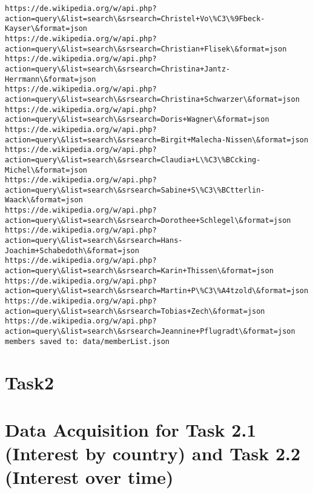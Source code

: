 \documentclass[11pt]{article}
\begin{document}
\begin{Verbatim}[commandchars=\\\{\}]
https://de.wikipedia.org/w/api.php?action=query\&list=search\&srsearch=Christel+Vo\%C3\%9Fbeck-Kayser\&format=json
https://de.wikipedia.org/w/api.php?action=query\&list=search\&srsearch=Christian+Flisek\&format=json
https://de.wikipedia.org/w/api.php?action=query\&list=search\&srsearch=Christina+Jantz-Herrmann\&format=json
https://de.wikipedia.org/w/api.php?action=query\&list=search\&srsearch=Christina+Schwarzer\&format=json
https://de.wikipedia.org/w/api.php?action=query\&list=search\&srsearch=Doris+Wagner\&format=json
https://de.wikipedia.org/w/api.php?action=query\&list=search\&srsearch=Birgit+Malecha-Nissen\&format=json
https://de.wikipedia.org/w/api.php?action=query\&list=search\&srsearch=Claudia+L\%C3\%BCcking-Michel\&format=json
https://de.wikipedia.org/w/api.php?action=query\&list=search\&srsearch=Sabine+S\%C3\%BCtterlin-Waack\&format=json
https://de.wikipedia.org/w/api.php?action=query\&list=search\&srsearch=Dorothee+Schlegel\&format=json
https://de.wikipedia.org/w/api.php?action=query\&list=search\&srsearch=Hans-Joachim+Schabedoth\&format=json
https://de.wikipedia.org/w/api.php?action=query\&list=search\&srsearch=Karin+Thissen\&format=json
https://de.wikipedia.org/w/api.php?action=query\&list=search\&srsearch=Martin+P\%C3\%A4tzold\&format=json
https://de.wikipedia.org/w/api.php?action=query\&list=search\&srsearch=Tobias+Zech\&format=json
https://de.wikipedia.org/w/api.php?action=query\&list=search\&srsearch=Jeannine+Pflugradt\&format=json
members saved to: data/memberList.json

    \end{Verbatim}

    \section{Task2}\label{task2}

    \section{Data Acquisition for Task 2.1 (Interest by country) and Task
2.2 (Interest over
time)}\label{data-acquisition-for-task-2.1-interest-by-country-and-task-2.2-interest-over-time}
\end{document}

